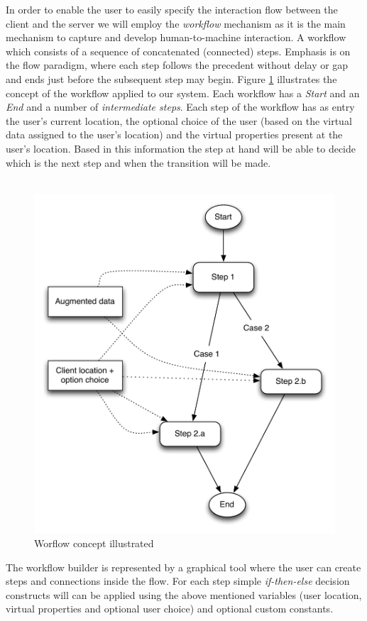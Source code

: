 In order to enable the user to easily specify the interaction flow between the client and the server we will employ the \emph{workflow} mechanism as it is the main mechanism to  capture and develop human-to-machine interaction. A workflow which consists of a sequence of concatenated (connected) steps. Emphasis is on the flow paradigm, where each step follows the precedent without delay or gap and ends just before the subsequent step may begin. Figure \ref{fig.design.workflow} illustrates the concept of the workflow applied to our system. Each workflow has a \emph{Start} and an \emph{End} and a number of \emph{intermediate steps}. Each step of the workflow has as entry the user's current location, the optional choice of the user (based on the virtual data assigned to the user's location) and the virtual properties present at the user's location. Based in this information the step at hand will be able to decide which is the next step and when the transition will be made.
\\\\
\begin{figure}[H]
	\centering
	\includegraphics[width=0.9\linewidth]{fig/workflow}
	\caption{Worflow concept illustrated}
	\label{fig.design.workflow}
\end{figure}
The workflow builder is represented by a graphical tool where the user can create steps and connections inside the flow. For each step simple \emph{if-then-else} decision constructs will can be applied using the above mentioned variables (user location, virtual properties and optional user choice) and optional custom constants.
\\\\

